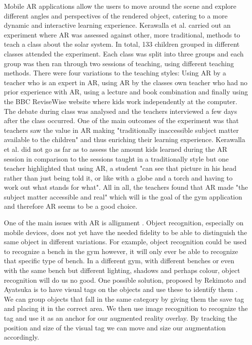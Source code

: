 \documentclass{l4proj}
\begin{document}
Mobile AR applications allow the users to move around the scene and explore different angles and perspectives of the rendered object, catering to a more dynamic and interactive learning experience\cite{fitzgerald_augmented_2013}\cite{dede_immersive_2009}. Kerawalla et al. carried out an experiment where AR was assessed against other, more traditional, methods to teach a class about the solar system\cite{kerawalla_making_2006}. In total, 133 children grouped in different classes attended the experiment. Each class was split into three groups and each group was then ran through two sessions of teaching, using different teaching methods. There were four variations to the teaching styles: Using AR by a teacher who is an expert in AR, using AR by the classes own teacher who had no prior experience with AR, using a lecture and book combination and finally using the BBC ReviseWise website where kids work independently at the computer. The debate during class was analysed and the teachers interviewed a few days after the class occurred. One of the main outcomes of the experiment was that teachers saw the value in AR making "traditionally inaccessible subject matter available to the children"\cite{kerawalla_making_2006} and thus enriching their learning experience. Kerawalla et al. did not go as far as to assess the amount kids learned during the AR session in comparison to the sessions taught in a traditionally style but one teacher highlighted that using AR, a student "can see that picture in his head rather than just being told it, or like with a globe and a torch and having to work out what stands for what"\cite{kerawalla_making_2006}. All in all, the teachers found that AR made "the  subject  matter  accessible  and real" which will is the goal of the gym application and therefore AR seems to be a good choice. 

One of the main issues with AR is allignment \cite{sood_pro_2012}. Object recognition, especially on mobile devices, does not yet have the needed fidelity to be able to distinguish the same object in different variations. For example, object recognition could be used to recognize a bench in the gym however, it will only ever be able to recognize that specific type of bench. In a different gym, with different benches or even with the same bench but different lighting, shadows and perhaps colour, object recognition will do us no good. One possible solution, proposed by Rekimoto and Ayatsuka is to have visual tags on the objects and use these to identify them \cite{rekimoto_cybercode:_2000}. We can group objects that fall in the same category by giving them the save tag and placing it in the correct area. We then use image recognition to recognize the tag and use it as an anchor for our augmented reality overlay. By tracking the position and size of the visual tag we can move and size our augmentation accordingly.  
\end{document}
